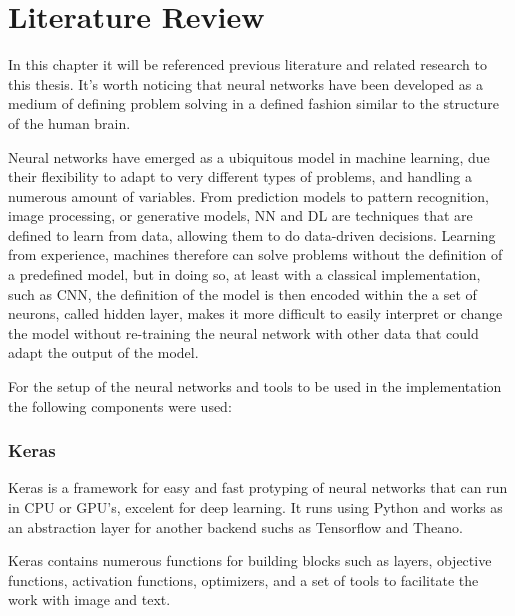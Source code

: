 \chapter{Literature Review} \label{chap:literature}

In this chapter it will be referenced previous literature and related research to this thesis.
It's worth noticing that neural networks have been developed as a medium of defining
problem solving in a defined fashion similar to the structure of the human brain.

Neural networks have emerged as a ubiquitous model in machine learning, due their flexibility 
to adapt to very different types of problems, and handling a numerous amount of variables.
From prediction models to pattern recognition, image processing, or generative models, NN and DL are
techniques that are defined to learn from data, allowing them to do data-driven decisions.
Learning from experience, machines therefore can solve problems without the definition
of a predefined model, but in doing so, at least with a classical implementation, such as
CNN, the definition of the model is then encoded within the a set of neurons, called hidden layer,
makes it more difficult to easily interpret or change the model without re-training the 
neural network with other data that could adapt the output of the model.

For the setup of the neural networks and tools to be used in the implementation
the following components were used:

\subsection{Keras}  \label{subSec:Keras}

Keras is a framework for easy and fast protyping of neural networks 
that can run in CPU or GPU's, excelent for deep learning. It runs using
Python and works as an abstraction layer for another backend suchs as
Tensorflow and Theano. 

Keras contains numerous functions for building blocks such as layers, 
objective functions, activation functions, optimizers, and a set of tools to facilitate 
the work with image and text.

